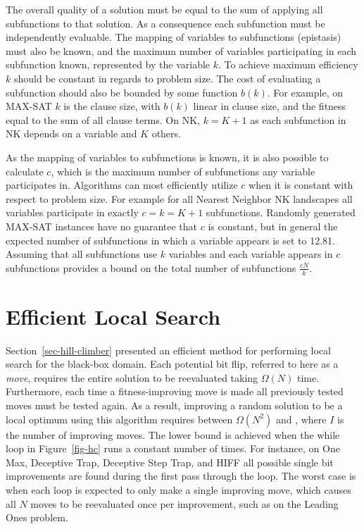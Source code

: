 
The overall quality of a solution must be equal to the sum of applying all subfunctions to that
solution. As a consequence each subfunction must be independently evaluable.
The mapping of variables to subfunctions (epistasis) must also be known, and
the maximum number of variables participating in each subfunction 
known,
represented by the variable $k$.
To achieve maximum efficiency $k$ should be constant in regards to problem size. The cost
of evaluating a subfunction should also be bounded by some function $b(k)$. For example, on MAX-SAT
$k$ is the clause size, with $b(k)$ linear in clause size, and the fitness equal to the sum of
all clause terms. On NK, $k=K+1$ as each subfunction in NK depends on a variable and $K$ others.

As the mapping of variables to subfunctions is known, it is also possible to calculate $c$, which
is the maximum number of subfunctions any variable participates in. 
Algorithms can most efficiently utilize $c$ when it is constant with
respect to
problem size. For example for all Nearest Neighbor NK landscapes all variables
participate in exactly $c=k=K+1$ subfunctions. Randomly generated MAX-SAT instances have no guarantee
that $c$ is constant, but in general the expected number of
subfunctions in which a variable appears is set to 12.81. %
Assuming that all subfunctions use $k$ variables and each variable appears in $c$ subfunctions
provides a bound on the total number of subfunctions %
$\frac{cN}{k}$.

\section{Efficient Local Search}
\label{sec-whitley-ls}
Section~\ref{sec-hill-climber} presented an efficient method for performing local search for the black-box
domain. Each potential bit flip, referred to here as a 
\textit{move}, requires the entire solution to be reevaluated
taking  
$\Omega(N)$ time.
Furthermore, each time a fitness-improving move is made all previously
tested moves must be tested again. As a result, %
improving a random solution to be a local optimum using this algorithm requires between $\Omega(N^2)$ and , where $I$ is the number
of improving moves. The lower bound is achieved when the while loop in Figure~\ref{fig-hc} runs a constant number of times.
For instance, %
on One Max, Deceptive Trap, Deceptive Step Trap, and HIFF all possible single bit improvements are found during
the first 
pass
through the loop. The worst case is when each loop is expected to only make a single improving move, which causes
all $N$ moves to be reevaluated once per improvement, such as on the Leading Ones problem.

